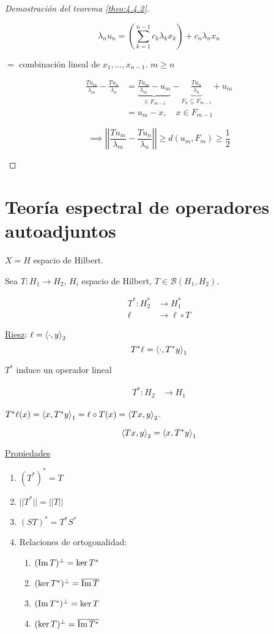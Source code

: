 \begin{proof}[Demostración del teorema \ref{theo:4.4.2}]
\begin{enumerate}[label=\alph*)]
      \[\lambda_n u_n=\left(\sum_{k=1}^{n-1} c_k\lambda_k x_k\right)+c_n\lambda_n x_n\]

      $=$ combinación lineal de $x_1,\ldots,x_{n-1}$. $m\geq n$

      \begin{align*}
         \frac{T u_m}{\lambda_m}-\frac{T u_n}{\lambda_n}&=\underbrace{\frac{T u_m}{\lambda_m}-u_m}_{\in F_{m-1}}-\underbrace{\frac{T u_n}{\lambda_n}}_{F_n\subseteq F_{m-1}}+u_m\\
         &=u_m-x,\quad x\in F_{m-1}
      \end{align*}

      \[\implies \left|\left| \frac{T u_m}{\lambda_m}-\frac{T u_n}{\lambda_n}\right|\right|\geq d(u_m, F_{m})\geq \frac{1}{2}\]
   \end{enumerate}
\end{proof}

\section{Teoría espectral de operadores autoadjuntos}

$X=H$ espacio de Hilbert.

Sea $T:H_1\to H_2$, $H_i$ espacio de Hilbert, $T\in\mathcal{B}(H_1,H_2)$.

\begin{align*}
   T^*:H_2^*&\to H_1^*\\
   \ell&\to\ell\circ T
\end{align*}

\underline{Riesz}: $\ell=\left\langle \cdot,y\right\rangle_{2}$
\[T^*\ell=\left\langle \cdot,T^*y\right\rangle_1\]

$T^*$ induce un operador lineal

\begin{align*}
   T^*:H_2&\to H_1
\end{align*}

$T^*\ell(x)=\left\langle x,T^*y\right\rangle_1=\ell\circ T(x)=\left\langle Tx,y\right\rangle_2$.

\[\left\langle Tx,y\right\rangle_2=\left\langle x,T^*y\right\rangle_1\]

\underline{Propiedades}

\begin{enumerate}
   \item $(T^*)^*=T$
   \item $||T^*||=||T||$
   \item $(ST)^*=T^*S^*$
   \item Relaciones de ortogonalidad:
   \begin{enumerate}
      \item $(\operatorname{Im} T)^\perp=\ker T^*$
      \item $(\ker T^*)^\perp=\overline{\operatorname{Im} T}$
      \item $(\operatorname{Im} T^*)^\perp=\ker T$
      \item $(\ker T)^\perp=\overline{\operatorname{Im} T^*}$
   \end{enumerate}
\end{enumerate}

